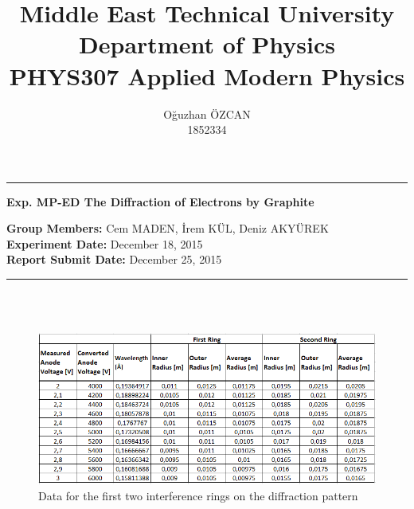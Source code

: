 \documentclass[a4paper,12pt]{article}
\title{Middle East Technical University\\Department of Physics\\\textbf{PHYS307 Applied Modern Physics}}
\author{Oğuzhan ÖZCAN\\1852334}
\date{}
\providecommand{\groupmember}[1]{\textbf{Group Members:} }
\providecommand{\expdate}[1]{\textbf{Experiment Date:} }
\providecommand{\repdate}[1]{\textbf{Report Submit Date:} }
\providecommand{\expname}[1]{\textbf{Exp. MP-ED The Diffraction of Electrons by Graphite} }
\begin{document}
\maketitle

\thispagestyle{fancy}

\noindent\rule{18.4cm}{0.8pt}
\begin{center}
	\expname{arg1}{}
\end{center}
\groupmember{arg1}{Cem MADEN, İrem KÜL, Deniz AKYÜREK}\\
\expdate{November 6, 2015}{December 18, 2015}\\
\repdate{arg1}{December 25, 2015}\\
\noindent\rule{18.4cm}{0.8pt}\\\\
\begin{figure}[h!]
\centering
\includegraphics[scale = 0.9]{"table 1"}
\caption{Data for the first two interference rings on the diffraction pattern}
\label{fig:table1}
\end{figure}
\end{document}

